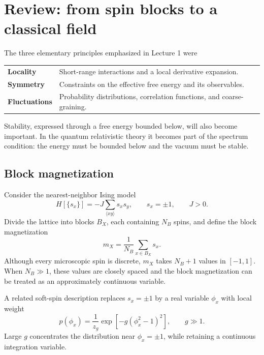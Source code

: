 \documentclass[11pt]{article}
\begin{document}
\section{Review: from spin blocks to a classical field}

The three elementary principles emphasized in Lecture 1 were
\begin{center}
\begin{tabular}{>{\bfseries}p{} p{}}
Locality & Short-range interactions and a local derivative expansion. \\
Symmetry & Constraints on the effective free energy and its observables. \\
Fluctuations & Probability distributions, correlation functions, and
coarse-graining. \\
\end{tabular}
\end{center}
Stability, expressed through a free energy bounded below, will also become
important.  In the quantum relativistic theory it becomes part of the
spectrum condition: the energy must be bounded below and the vacuum must be
stable.

\subsection{Block magnetization}

Consider the nearest-neighbor Ising model
\begin{equation}
  H[\{s_x\}]=-J\sum_{\langle xy\rangle}s_xs_y,
  \qquad s_x=\pm1,
  \qquad J>0.
  \label{eq:IsingH}
\end{equation}
Divide the lattice into blocks $B_X$, each containing $N_B$ spins, and define
the block magnetization
\begin{equation}
  m_X=\frac{1}{N_B}\sum_{x\in B_X}s_x.
  \label{eq:blockm}
\end{equation}
Although every microscopic spin is discrete, $m_X$ takes $N_B+1$ values in
$[-1,1]$.  When $N_B\gg1$, these values are closely spaced and the block
magnetization can be treated as an approximately continuous variable.

A related soft-spin description replaces $s_x=\pm1$ by a real variable
$\phi_x$ with local weight
\begin{equation}
  p(\phi_x)=\frac{1}{z_g}\exp\left[-g(\phi_x^2-1)^2\right],
  \qquad g\gg1.
  \label{eq:softspin}
\end{equation}
Large $g$ concentrates the distribution near $\phi_x=\pm1$, while retaining
a continuous integration variable.
\end{document}
